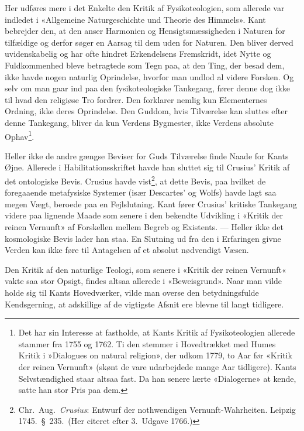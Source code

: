 \documentclass[12pt,a4paper]{article}
\newcommand{\apage}[1]{\marginnote{\footnotesize\textit{[#1]}}}
\begin{document}
Her udføres mere i det Enkelte den Kritik af
Fysikoteologien, som allerede var indledet i «Allgemeine Naturgeschichte
und Theorie des Himmels». Kant bebrejder den, at den anser Harmonien og
Hensigtsmæssigheden i Naturen for tilfældige og derfor søger en Aarsag
til dem uden for Naturen. Den bliver derved uvidenskabelig og har ofte
hindret Erkendelsens Fremskridt, idet Nytte og Fuldkommenhed bleve
betragtede som Tegn paa, at den Ting, der besad dem, ikke havde nogen
naturlig Oprindelse, hvorfor man undlod al videre Forsken. Og selv om man
gaar ind paa den fysikoteologiske Tankegang, fører denne dog ikke til
hvad den religiøse Tro fordrer. Den forklarer nemlig kun Elementernes
Ordning, ikke deres Oprindelse. Den Guddom, hvis Tilværelse kan sluttes
efter denne Tankegang, bliver da kun Verdens Bygmester, ikke Verdens
absolute Ophav\footnote{Det har sin Interesse at fastholde, at Kants
Kritik af Fysikoteologien allerede stammer fra 1755 og 1762. Ti den
stemmer i Hovedtrækket med Humes Kritik i »Dialogues on natural
religion», der udkom 1779, to Aar før «Kritik der reinen Vernunft»
(skønt de vare udarbejdede mange Aar tidligere). Kants Selvstændighed
staar altsaa fast. Da han senere lærte «Dialogerne» at kende, satte han
stor Pris paa dem.}.

\apage{12} Heller ikke de andre gængse Beviser for Guds Tilværelse finde Naade for
Kants Øjne. Allerede i Habilitationsskriftet havde han sluttet sig til
Crusius' Kritik af det ontologiske Bevis. Crusius havde
vist\footnote{Chr.\ Aug.\ \emph{Crusius}: Entwurf der nothwendigen
Vernunft-Wahrheiten. Leipzig 1745.\ §\ 235.\ (Her citeret efter 3.\
Udgave 1766.)}, at dette Bevis, paa hvilket de foregaaende metafysiske
Systemer (især Descartes' og Wolfs) havde lagt saa megen Vægt, beroede
paa en Fejlslutning. Kant fører Crusius' kritiske Tankegang videre paa
lignende Maade som senere i den bekendte Udvikling i «Kritik der reinen
Vernunft» af Forskellen mellem Begreb og Existents. --- Heller ikke det
kosmologiske Bevis lader han staa. En Slutning ud fra den i Erfaringen
givne Verden kan ikke føre til Antagelsen af et absolut nødvendigt Væsen.

Den Kritik af den naturlige Teologi, som senere i «Kritik der reinen
Vernunft« vakte saa stor Opsigt, findes altsaa allerede i «Beweisgrund».
Naar man vilde holde sig til Kants Hovedværker, vilde man overse den
betydningsfulde Kendsgerning, at adskillige af de vigtigste Afsnit ere
blevne til langt tidligere.
\end{document}
